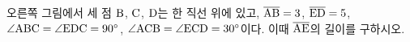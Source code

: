 \noindent\begin{minipage}[t]{0.58\linewidth}\vspace{0pt}\raggedright 오른쪽 그림에서 세 점 $\mathrm{B}$, $\mathrm{C}$, $\mathrm{D}$는 한 직선 위에 있고, $\overline{\mathrm{AB}}=3$, $\overline{\mathrm{ED}}=5$, $\angle\mathrm{ABC}=\angle\mathrm{EDC}=90^\circ$, $\angle\mathrm{ACB}=\angle\mathrm{ECD}=30^\circ$이다. 이때 $\overline{\mathrm{AE}}$의 길이를 구하시오.\end{minipage}\hfill\begin{minipage}[t]{0.4\linewidth}\vspace{0pt}\centering \resizebox{\ifdim\width>\linewidth\linewidth\else\width\fi}{!}{}\end{minipage}\par
